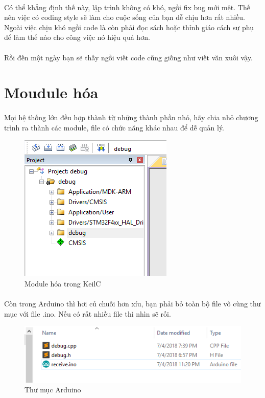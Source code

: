 \documentclass[12pt,a5paper]{book}
\begin{document}
\paragraph{}
Có thể khẳng định thế này, lập trình không có khó, ngồi fix bug mới mệt. Thế nên việc có coding style sẽ làm cho cuộc sống của bạn dễ chịu hơn rất nhiều. Ngoài việc chịu khó ngồi code là còn phải đọc sách hoặc thỉnh giáo cách sư phụ để làm thế nào cho công việc nó hiệu quả hơn.
\paragraph{}
Rồi đến một ngày bạn sẽ thấy ngồi viết code cũng giống như viết văn xuôi vậy.
\newpage
\section{Moudule hóa}
\paragraph{}
Mọi hệ thống lớn đều hợp thành từ những thành phần nhỏ, hãy chia nhỏ chương trình ra thành các module, file có chức năng khác nhau để dễ quản lý.
\begin{figure}[h!]
\centering
 \includegraphics[width=0.6\linewidth]{module.png}
 \caption{Module hóa trong KeilC}
\end{figure}
\paragraph{}
Còn trong Arduino thì hơi củ chuối hơn xíu, bạn phải bỏ toàn bộ file vô cùng thư mục với file .ino. Nếu có rất nhiều file thì nhìn sẽ rối. 
\begin{figure}[h!]
\centering
 \includegraphics[width=1\linewidth]{arduino_folder.png}
 \caption{Thư mục Arduino}
\end{figure}
\end{document}

